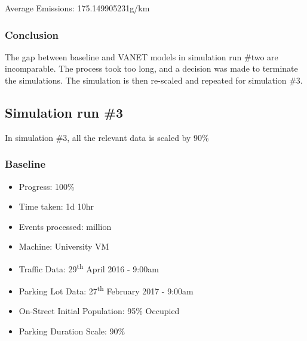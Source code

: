 Average Emissions: 175.149905231g/km

\subsubsection{Conclusion}
The gap between baseline and \ac{VANET} models in simulation run \#two are incomparable. The process took too long, and a decision was made to terminate the simulations. The simulation is then re-scaled and repeated for simulation \#3.

\pagebreak

\subsection{Simulation run \#3}
In simulation \#3, all the relevant data is scaled by 90\%

\subsubsection{Baseline}
\begin{itemize}
    \setlength\itemsep{0em}
    \item Progress: 100\%
    \item Time taken: 1d 10hr
    \item Events processed:  million
    \item Machine: University VM
    \item Traffic Data: 29\textsuperscript{th} April 2016 - 9:00am
    \item Parking Lot Data: 27\textsuperscript{th} February 2017 - 9:00am
    \item On-Street Initial Population: 95\% Occupied
    \item Parking Duration Scale: 90\%
\end{itemize}

